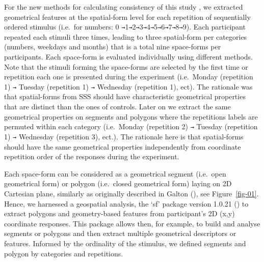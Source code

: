 \documentclass[
  man,
  floatsintext,
  longtable,
  a4paper,
  nolmodern,
  notxfonts,
  notimes,
  colorlinks=true,linkcolor=blue,citecolor=blue,urlcolor=blue]{apa7}
\begin{document}
For the new methods for calculating consistency of this study
,
we extracted geometrical features at the spatial-form level for each
repetition of sequentially ordered stimulus (i.e.~for numbers: 0
\texttt{→}1\texttt{→}2\texttt{→}3\texttt{→}4\texttt{→}5\texttt{→}6\texttt{→}7\texttt{→}8\texttt{→}9).
Each participant repeated each stimuli three times, leading to three
spatial-form per categories (numbers, weekdays and months) that is a
total nine space-forms per participants. Each space-form is evaluated
individually using different methods. Note that the stimuli forming the
space-forms are selected by the first time or repetition each one is
presented during the experiment (i.e.~Monday (repetition 1) \texttt{→}
Tuesday (repetition 1) \texttt{→} Wednesday (repetition 1), ect). The
rationale was that spatial-forms from SSS should have characteristic
geometrical properties that are distinct than the ones of controls.
Later on we extract the same geometrical properties on segments and
polygons where the repetitions labels are permuted within each category
(i.e.~Monday (repetition 2) \texttt{→} Tuesday (repetition 1) \texttt{→}
Wednesday (repetition 3), ect.). The rationale here is that
spatial-forms should have the same geometrical properties independently
from coordinate repetition order of the responses during the experiment.

Each space-form can be considered as a geometrical segment (i.e.~open
geometrical form) or polygon (i.e.~closed geometrical form) laying on 2D
Cartesian plane, similarly as originally described in Galton
(), see Figure~\ref{fig-01}.
Hence, we harnessed a geospatial analysis, the `sf' package version
1.0.21 () to extract polygons
and geometry-based features from participant's 2D (x,y) coordinate
responses. This package allows then, for example, to build and analyse
segments or polygons and then extract multiple geometrical descriptors
or features. Informed by the ordinality of the stimulus, we defined
segments and polygon by categories
and repetitions.

\end{document}
